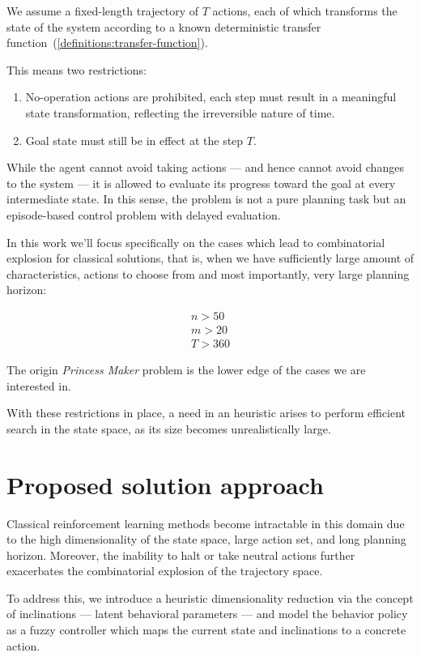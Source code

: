 \documentclass[11pt, a4paper]{article}
\begin{document}
	We assume a fixed-length trajectory of $𝑇$ actions, each of which transforms the state of the system according to a known deterministic transfer function~(\ref{definitions:transfer-function}).

	This means two restrictions:
	
	\begin{enumerate}
		\item No-operation actions are prohibited, each step must result in a meaningful state transformation, reflecting the irreversible nature of time.
		\item Goal state must still be in effect at the step $T$.
	\end{enumerate}

	While the agent cannot avoid taking actions — and hence cannot avoid changes to the system — it is allowed to evaluate its progress toward the goal at every intermediate state.
	In this sense, the problem is not a pure planning task but an episode-based control problem with delayed evaluation.
	
	In this work we'll focus specifically on the cases which lead to combinatorial explosion for classical solutions, that is, when we have sufficiently large amount of characteristics, actions to choose from and most importantly, very large planning horizon:
	
	\begin{eqnarray}
		n > 50 \\
		m > 20 \\
		T > 360
	\end{eqnarray}
	
	The origin \textit{Princess Maker} problem is the lower edge of the cases we are interested in.

	With these restrictions in place, a need in an heuristic arises to perform efficient search in the state space, as its size becomes unrealistically large.
	
	\section{Proposed solution approach}

Classical reinforcement learning methods become intractable in this domain due to the high dimensionality of the state space, large action set, and long planning horizon. Moreover, the inability to halt or take neutral actions further exacerbates the combinatorial explosion of the trajectory space.

To address this, we introduce a heuristic dimensionality reduction via the concept of inclinations — latent behavioral parameters — and model the behavior policy as a fuzzy controller which maps the current state and inclinations to a concrete action.
\end{document}
